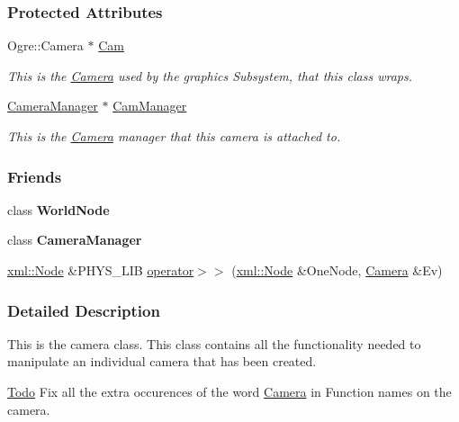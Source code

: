 \subsubsection*{Protected Attributes}
\begin{DoxyCompactItemize}
\item 
Ogre::Camera $\ast$ \hyperlink{classphys_1_1Camera_a91622148b9b9a9ae1554c828f7e2fc89}{Cam}
\begin{DoxyCompactList}\small\item\em This is the \hyperlink{classphys_1_1Camera}{Camera} used by the graphics Subsystem, that this class wraps. \item\end{DoxyCompactList}\item 
\hyperlink{classphys_1_1CameraManager}{CameraManager} $\ast$ \hyperlink{classphys_1_1Camera_a909203ede748deb1b587a8758ba8cec4}{CamManager}
\begin{DoxyCompactList}\small\item\em This is the \hyperlink{classphys_1_1Camera}{Camera} manager that this camera is attached to. \item\end{DoxyCompactList}\end{DoxyCompactItemize}
\subsubsection*{Friends}
\begin{DoxyCompactItemize}
\item 
\hypertarget{classphys_1_1Camera_a1cacd07efb11226da49a7c80569b18e8}{
class {\bfseries WorldNode}}
\label{d9/df8/classphys_1_1Camera_a1cacd07efb11226da49a7c80569b18e8}

\item 
\hypertarget{classphys_1_1Camera_afae5bf9a900e8c5bc70c9332785e8465}{
class {\bfseries CameraManager}}
\label{d9/df8/classphys_1_1Camera_afae5bf9a900e8c5bc70c9332785e8465}

\item 
\hyperlink{classphys_1_1xml_1_1Node}{xml::Node} \&PHYS\_\-LIB \hyperlink{classphys_1_1Camera_a903516ddc793b1d17d4d766a13bd6962}{operator$>$$>$} (\hyperlink{classphys_1_1xml_1_1Node}{xml::Node} \&OneNode, \hyperlink{classphys_1_1Camera}{Camera} \&Ev)
\end{DoxyCompactItemize}


\subsubsection{Detailed Description}
This is the camera class. This class contains all the functionality needed to manipulate an individual camera that has been created. \begin{Desc}
\item[\hyperlink{todo__todo000005}{Todo}]Fix all the extra occurences of the word \hyperlink{classphys_1_1Camera}{Camera} in Function names on the camera. \end{Desc}


